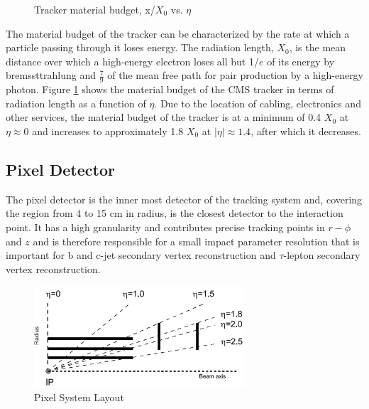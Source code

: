\begin{figure}[hb]
\begin{subfigure}[b]{.45\textwidth}
    \end{subfigure}	
  	\caption[Tracker Material Budget]
   	{Tracker material budget, x/$X_{0}$ vs. $\eta$}
	\label{fig:trackerMaterial}
\end{figure}

The material budget of the tracker can be characterized by the rate at which a particle
passing through it loses energy. The radiation length, $X_{0}$, is the 
mean distance over which a high-energy electron loses all but 1/$e$ 
of its energy by bremssttrahlung %
and $\frac{7}{9}$ of the mean free path for pair production by 
a high-energy photon. Figure \ref{fig:trackerMaterial}
shows the material budget of the CMS tracker in terms of radiation length as a function of $\eta$. 
Due to the location of cabling, electronics and other services, the material budget of the 
tracker is at a minimum of 0.4 $X_{0}$ at $\eta \approx 0$ and increases to approximately 1.8 $X_{0}$
at $|\eta| \approx 1.4$, after which it decreases. 

\subsection{Pixel Detector}%
The pixel detector is the inner most detector of the tracking system and,
covering the region from 4 to 15 cm in radius, is the closest detector to 
the interaction point. It has a high granularity and contributes precise 
tracking points in $r-\phi$ and $z$ and is therefore responsible for a small impact 
parameter resolution that is important for b and c-jet secondary
vertex reconstruction and $\tau$-lepton secondary vertex reconstruction.

\begin{figure}[hb]
  \centering
	\includegraphics[width=0.7\textwidth]{images/pixelLayout.png}
  	\caption[Pixel System Layout]
   	{Pixel System Layout}
	\label{fig:pixelLayout}
\end{figure}

